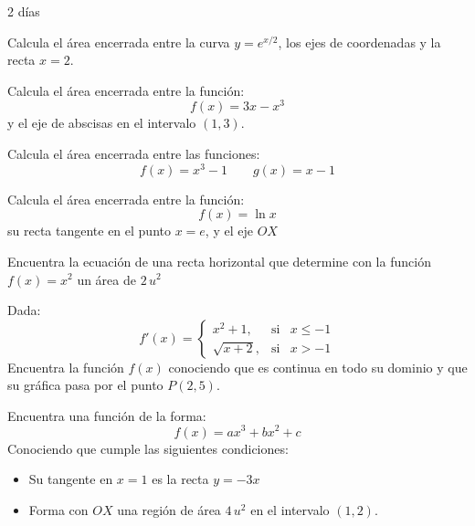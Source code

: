 \begin{definicion}{2 días}
\end{definicion}

\begin{ejemplo}{
Calcula el área encerrada entre la curva $y=e^{x/2}$, los ejes de coordenadas y la recta $x=2$.
}
\end{ejemplo}

\begin{ejemplo}{
Calcula el área encerrada entre la función:
\[f(x)=3x-x^3\]
y el eje de abscisas en el intervalo $(1,3)$.
}
\end{ejemplo}

\begin{ejemplo}{
Calcula el área encerrada entre las funciones:
\[f(x)=x^3-1\qquad g(x)=x-1\]
}
\end{ejemplo}

\begin{ejemplo}{
Calcula el área encerrada entre la función:
\[f(x)=\ln{x}\]
su recta tangente en el punto $x=e$, y el eje $OX$
}
\end{ejemplo}

\begin{ejemplo}{
Encuentra la ecuación de una recta horizontal que determine con la función $f(x)=x^2$ un área de $2\,u^2$
}
\end{ejemplo}

\begin{ejemplo}{
Dada:
\[f'(x)=\left\{\begin{array}{ccc}
    x^2+1,&\text{si}&x\leqslant-1\\[5pt]
    \sqrt{x+2},&\text{si}&x>-1
\end{array}\right.\]
Encuentra la función $f(x)$ conociendo que es continua en todo su dominio y que su gráfica pasa por el punto $P(2,5)$.
}
\end{ejemplo}

\begin{ejemplo}{
Encuentra una función de la forma:
\[f(x)=ax^3+bx^2+c\]
Conociendo que cumple las siguientes condiciones:
\begin{itemize}
 \item Su tangente en $x=1$ es la recta $y=-3x$
 \item Forma con $OX$ una región de área $4\,u^2$ en el intervalo $(1,2)$.
\end{itemize}
}
\end{ejemplo}


